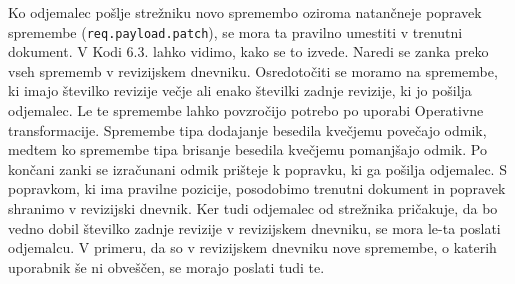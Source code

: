 \documentclass[a4paper, 12pt, twoside]{book}
\begin{document}
Ko odjemalec pošlje strežniku novo spremembo oziroma natančneje popravek spremembe ({\tt req.payload.patch}), se mora ta pravilno umestiti v trenutni dokument. V Kodi 6.3. lahko vidimo, kako se to izvede. Naredi se zanka preko vseh sprememb v revizijskem dnevniku. Osredotočiti se moramo na spremembe, ki imajo številko revizije večje ali enako številki zadnje revizije, ki jo pošilja odjemalec. Le te spremembe lahko povzročijo potrebo po uporabi Operativne transformacije. Spremembe tipa dodajanje besedila kvečjemu povečajo odmik, medtem ko spremembe tipa brisanje besedila kvečjemu pomanjšajo odmik. Po končani zanki se izračunani odmik prišteje k popravku, ki ga pošilja odjemalec. S popravkom, ki ima pravilne pozicije, posodobimo trenutni dokument in popravek shranimo v revizijski dnevnik. Ker tudi odjemalec od strežnika pričakuje, da bo vedno dobil številko zadnje revizije v revizijskem dnevniku, se mora le-ta poslati odjemalcu. V primeru, da so v revizijskem dnevniku nove spremembe, o katerih uporabnik še ni obveščen, se morajo poslati tudi te.\newline
\end{document}
